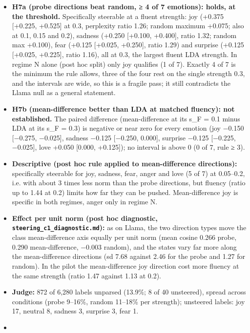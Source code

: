 \documentclass[
  10pt,
]{article}
\providecommand{\tightlist}{%
  \setlength{\itemsep}{0pt}\setlength{\parskip}{0pt}}
\begin{document}
\begin{itemize}
\tightlist
\item
  \textbf{H7a (probe directions beat random, ≥ 4 of 7 emotions): holds,
  at the threshold.} Specifically steerable at a fluent strength: joy
  (+0.375 {[}+0.225, +0.525{]} at 0.3, perplexity ratio 1.26; random
  maximum +0.075; also at 0.1, 0.15 and 0.2), sadness (+0.250 {[}+0.100,
  +0.400{]}, ratio 1.32; random max +0.100), fear (+0.125 {[}+0.025,
  +0.250{]}, ratio 1.29) and surprise (+0.125 {[}+0.025, +0.225{]},
  ratio 1.16), all at 0.3, the largest fluent LDA strength. In regime N
  alone (post hoc split) only joy qualifies (1 of 7). Exactly 4 of 7 is
  the minimum the rule allows, three of the four rest on the single
  strength 0.3, and the intervals are wide, so this is a fragile pass;
  it still contradicts the Llama null as a general statement.
\item
  \textbf{H7b (mean-difference better than LDA at matched fluency): not
  established.} The paired difference (mean-difference at its s\_F = 0.1
  minus LDA at its s\_F = 0.3) is negative or near zero for every
  emotion (joy −0.150 {[}−0.275, −0.025{]}, sadness −0.125 {[}−0.250,
  0.000{]}, surprise −0.125 {[}−0.225, −0.025{]}, love +0.050 {[}0.000,
  +0.125{]}); no interval is above 0 (0 of 7, rule ≥ 3).
\item
  \textbf{Descriptive (post hoc rule applied to mean-difference
  directions):} specifically steerable for joy, sadness, fear, anger and
  love (5 of 7) at 0.05--0.2, i.e. with about 3 times less norm than the
  probe directions, but fluency (ratio up to 1.44 at 0.2) limits how far
  they can be pushed. Mean-difference joy is specific in both regimes,
  anger only in regime N.
\item
  \textbf{Effect per unit norm (post hoc diagnostic,
  \texttt{steering\_c1\_diagnostic.md}):} as on Llama, the two direction
  types move the class mean-difference axis equally per unit norm (mean
  cosine 0.266 probe, 0.290 mean-difference, −0.003 random), and the
  states vary far more along the mean-difference directions (sd 7.68
  against 2.46 for the probe and 1.27 for random). In the pilot the
  mean-difference joy direction cost more fluency at the same strength
  (ratio 1.47 against 1.13 at 0.2).
\item
  \textbf{Judge:} 872 of 6,280 labels unparsed (13.9\%; 8 of 40
  unsteered), spread across conditions (probe 9--16\%, random 11--18\%
  per strength); unsteered labels: joy 17, neutral 8, sadness 3,
  surprise 3, fear 1.
\item

\end{itemize}
\end{document}
